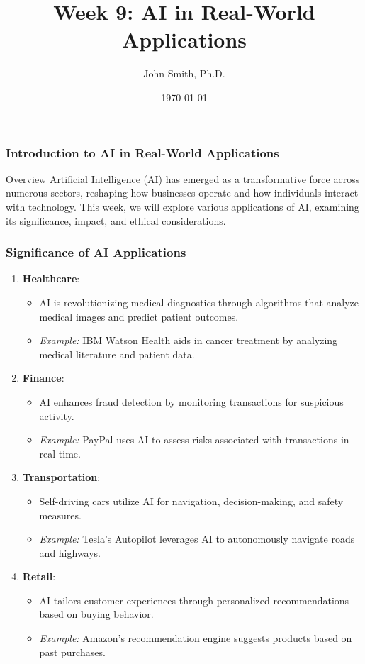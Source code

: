 \documentclass[aspectratio=169]{beamer}
\title[Week 9: AI in Real-World Applications]{Week 9: AI in Real-World Applications}
\author[J. Smith]{John Smith, Ph.D.}
\institute[University Name]{
  Department of Computer Science\\
  University Name\\
  \vspace{0.3cm}
  Email: email@university.edu\\
  Website: www.university.edu
}
\date{\today}
\begin{document}
\frame{\titlepage}

\begin{frame}[fragile]
    \frametitle{Introduction to AI in Real-World Applications}
    \begin{block}{Overview}
        Artificial Intelligence (AI) has emerged as a transformative force across numerous sectors, reshaping how businesses operate and how individuals interact with technology. This week, we will explore various applications of AI, examining its significance, impact, and ethical considerations.
    \end{block}
\end{frame}

\begin{frame}[fragile]
    \frametitle{Significance of AI Applications}
    \begin{enumerate}
        \item \textbf{Healthcare}:
            \begin{itemize}
                \item AI is revolutionizing medical diagnostics through algorithms that analyze medical images and predict patient outcomes.
                \item \textit{Example:} IBM Watson Health aids in cancer treatment by analyzing medical literature and patient data.
            \end{itemize}

        \item \textbf{Finance}:
            \begin{itemize}
                \item AI enhances fraud detection by monitoring transactions for suspicious activity.
                \item \textit{Example:} PayPal uses AI to assess risks associated with transactions in real time.
            \end{itemize}

        \item \textbf{Transportation}:
            \begin{itemize}
                \item Self-driving cars utilize AI for navigation, decision-making, and safety measures.
                \item \textit{Example:} Tesla's Autopilot leverages AI to autonomously navigate roads and highways.
            \end{itemize}

        \item \textbf{Retail}:
            \begin{itemize}
                \item AI tailors customer experiences through personalized recommendations based on buying behavior.
                \item \textit{Example:} Amazon's recommendation engine suggests products based on past purchases.
            \end{itemize}


\end{enumerate}
\end{frame}
\end{document}
